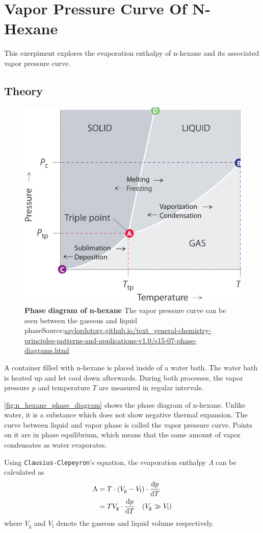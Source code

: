 \chapter{Vapor Pressure Curve Of N-Hexane}
This exerpiment explores the evaporation enthalpy of n-hexane and its associated vapor pressure curve.

\section{Theory}
\begin{figure}[tbp]
	\centering
	\includegraphics[width=.4\textwidth]{./img/phase.jpg}
	\caption[Phase diagram of n-hexane]{\textbf{Phase diagram of n-hexane} The vapor pressure curve can be seen between the gaseous and liquid phase\newline Source:\url{saylordotorg.github.io/text_general-chemistry-principles-patterns-and-applications-v1.0/s15-07-phase-diagrams.html}}
	\label{fig:n_hexane_phase_diagram}
\end{figure}

A container filled with n-hexane is placed inside of a water bath.
The water bath is heated up and let cool down afterwards.
During both processes, the vapor pressure $p$ and temperature $T$ are measured in regular intervals.

\autoref{fig:n_hexane_phase_diagram} shows the phase diagram of n-hexane.
Unlike water, it is a substance which does not show negative thermal expansion.
The curve between liquid and vapor phase is called the vapor pressure curve.
Points on it are in phase equilibrium, which means that the same amount of vapor condensates as water evaporates.

Using \texttt{Clausius-Clepeyron}'s equation, the evaporation enthalpy $\Lambda$ can be calculated as
\begin{align}\label{eq:evap_enth}
	\Lambda&=T\cdot\left(V_\text{g}-V_\text{l}\right)\cdot\frac{\text{d} p}{\text{d} T} \nonumber \\
	&=TV_\text{g}\cdot\frac{\text{d} p}{\text{d} T}\quad(V_\text{g}\gg V_\text{l})
\end{align}
where $V_\text{g}$ and $V_\text{l}$ denote the gaseous and liquid volume respectively.


